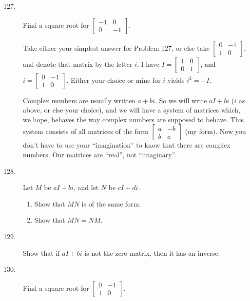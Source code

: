 \documentclass{article}
\begin{document}
\begin{description}

  \item[127.] Find a square root for $\begin{bmatrix} -1 & 0 \\ 0 & -1 \end{bmatrix}$.

  \item[] Take either your simplest answer for Problem 127, or else take $\begin{bmatrix} 0 & -1 \\ 1 & 0 \end{bmatrix}$, and denote that matrix by the letter $i$. I have $I = \begin{bmatrix} 1 & 0 \\ 0 & 1 \end{bmatrix}$, and $i = \begin{bmatrix} 0 & -1 \\ 1 & 0 \end{bmatrix}$. Either your choice or mine for $i$ yields $i^2 = -I$.

    Complex numbers are usually written $a+bi$. So we will write $aI+bi$ ($i$ as above, or else your choice), and we will have a system of matrices which, we hope, behaves the way complex numbers are supposed to behave. This system consists of all matrices of the form $\begin{bmatrix} a & -b \\ b & a \end{bmatrix}$ (my form). Now you don't have to use your ``imagination'' to know that there are complex numbers. Our matrices are ``real'', not ``imaginary''.

  \item[128.] Let $M$ be $aI+bi$, and let $N$ be $cI+di$.
    \begin{enumerate}[\hspace{1cm}(a)]
      \item Show that $MN$ is of the same form.
      \item Show that $MN = NM$.
    \end{enumerate}

  \item[129.] Show that if $aI+bi$ is not the zero matrix, then it has an inverse.

  \item[130.] Find a square root for $\begin{bmatrix} 0 & -1 \\ 1 & 0 \end{bmatrix}$.


\end{description}
\end{document}
